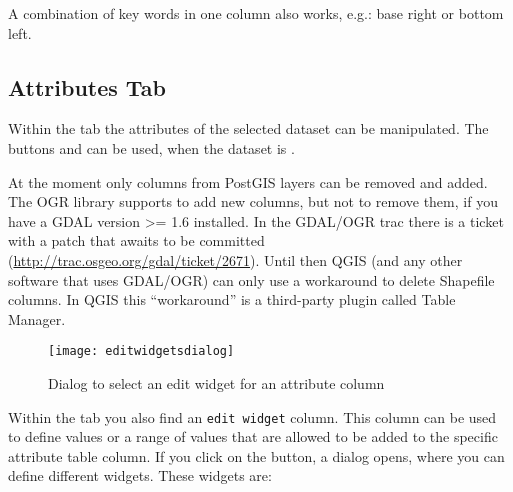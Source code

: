A combination of key words in one column also works, e.g.: base right or bottom left.

\subsection{Attributes Tab}\label{label_attributes}

Within the  tab the attributes of the selected dataset can be
manipulated. The buttons  and
 can be
used, when the dataset is .

At the moment only columns from PostGIS layers can be removed and added. The
OGR library supports to add new columns, but not to remove them, if you have
a GDAL version >= 1.6 installed.  In the GDAL/OGR trac there is a ticket with a patch that
awaits to be committed (\url{http://trac.osgeo.org/gdal/ticket/2671}). Until then QGIS
(and any other software that uses GDAL/OGR) can only use a workaround to delete
Shapefile columns. In QGIS this ``workaround'' is a third-party plugin called
Table Manager.


\begin{figure}[ht]
   \centering
   \texttt{[image: editwidgetsdialog]}
   \caption{Dialog to select an edit widget for an attribute column
\nixcaption}\label{fig:editwidget}
\end{figure}

Within the  tab you also find an \texttt{edit widget} column.
This column can be used to define values or a range of values that are
allowed
to be added to the specific attribute table column. If you click on the
 button, a dialog opens, where you can define different
widgets. These widgets are:

